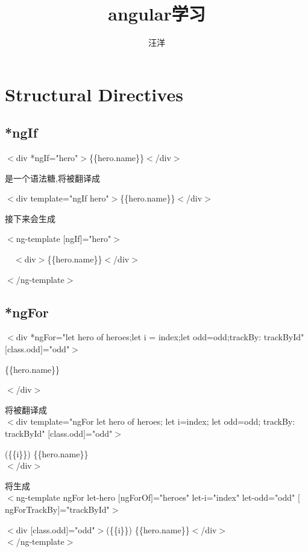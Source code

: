 \documentclass{article}
\begin{document}
\title{angular学习}
\author{汪洋}
\maketitle

\newpage
\tableofcontents
\newpage


\section{Structural Directives}


\subsection{*ngIf}


$<$div *ngIf="hero"$>$\{\{hero.name\}\}$<$/div$>$

是一个语法糖,将被翻译成

\par $<$div template="ngIf hero"$>$\{\{hero.name\}\}$<$/div$>$

\par 接下来会生成

\par $<$ng-template $[$ngIf$]$="hero"$>$
\par\ \ $<$div$>$\{\{hero.name\}\}$<$/div$>$
\par $<$/ng-template$>$


\subsection{*ngFor}

$<$div *ngFor="let hero of heroes;let i = index;let odd=odd;trackBy: trackById" $[$class.odd$]$="odd"$>$
\par \{\{hero.name\}\}
\par $<$/div$>$
\par 将被翻译成\\
$<$div template="ngFor let hero of heroes; let i=index; let odd=odd; trackBy: trackById" $[$class.odd$]$="odd"$>$
\par  (\{\{i\}\}) \{\{hero.name\}\}\\
$<$/div$>$
\par 将生成\\
$<$ng-template ngFor let-hero $[$ngForOf$]$="heroes" let-i="index" let-odd="odd" $[$ngForTrackBy$]$="trackById"$>$
\par  $<$div $[$class.odd$]$="odd"$>$(\{\{i\}\}) \{\{hero.name\}\}$<$/div$>$\\
$<$/ng-template$>$
\end{document}
